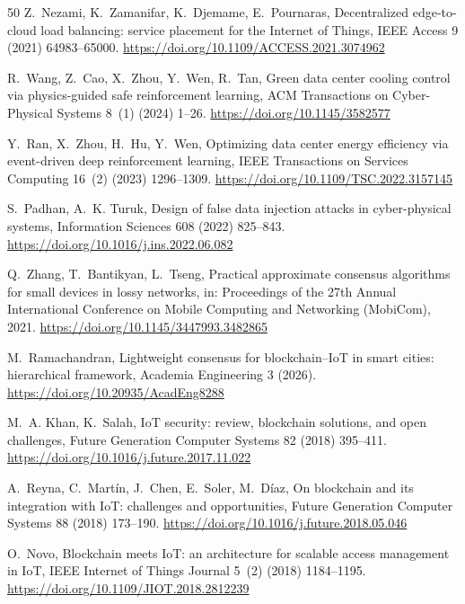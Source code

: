 \documentclass[preprint,11pt]{elsarticle}
\begin{document}
\begin{thebibliography}{50}
Z.~Nezami, K.~Zamanifar, K.~Djemame, E.~Pournaras, Decentralized
edge-to-cloud load balancing: service placement for the Internet of
Things, IEEE Access 9 (2021) 64983--65000.
\url{https://doi.org/10.1109/ACCESS.2021.3074962}

R.~Wang, Z.~Cao, X.~Zhou, Y.~Wen, R.~Tan, Green data center cooling
control via physics-guided safe reinforcement learning, ACM
Transactions on Cyber-Physical Systems 8~(1) (2024) 1--26.
\url{https://doi.org/10.1145/3582577}

Y.~Ran, X.~Zhou, H.~Hu, Y.~Wen, Optimizing data center energy
efficiency via event-driven deep reinforcement learning, IEEE
Transactions on Services Computing 16~(2) (2023) 1296--1309.
\url{https://doi.org/10.1109/TSC.2022.3157145}

S.~Padhan, A.~K. Turuk, Design of false data injection attacks in
cyber-physical systems, Information Sciences 608 (2022) 825--843.
\url{https://doi.org/10.1016/j.ins.2022.06.082}

Q.~Zhang, T.~Bantikyan, L.~Tseng, Practical approximate consensus
algorithms for small devices in lossy networks, in: Proceedings of the
27th Annual International Conference on Mobile Computing and Networking
(MobiCom), 2021.
\url{https://doi.org/10.1145/3447993.3482865}


M.~Ramachandran, Lightweight consensus for blockchain--IoT in smart
cities: hierarchical framework, Academia Engineering 3 (2026).
\url{https://doi.org/10.20935/AcadEng8288}

M.~A. Khan, K.~Salah, IoT security: review, blockchain solutions, and
open challenges, Future Generation Computer Systems 82 (2018)
395--411.
\url{https://doi.org/10.1016/j.future.2017.11.022}

A.~Reyna, C.~Mart\'in, J.~Chen, E.~Soler, M.~D\'iaz, On blockchain and
its integration with IoT: challenges and opportunities, Future
Generation Computer Systems 88 (2018) 173--190.
\url{https://doi.org/10.1016/j.future.2018.05.046}

O.~Novo, Blockchain meets IoT: an architecture for scalable access
management in IoT, IEEE Internet of Things Journal 5~(2) (2018)
1184--1195.
\url{https://doi.org/10.1109/JIOT.2018.2812239}


\end{thebibliography}
\end{document}
